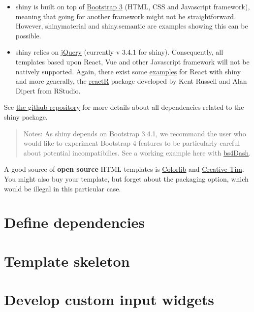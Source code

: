 \documentclass[]{book}
\providecommand{\tightlist}{%
  \setlength{\itemsep}{0pt}\setlength{\parskip}{0pt}}
\begin{document}
\begin{itemize}
\tightlist
\item
  shiny is built on top of \href{https://getbootstrap.com/docs/3.3/}{Bootstrap 3} (HTML, CSS and Javascript framework), meaning that going for another framework might
  not be straightforward. However, shinymaterial and shiny.semantic are examples showing
  this can be possible.
\item
  shiny relies on \href{https://jquery.com}{jQuery} (currently v 3.4.1 for shiny). Consequently, all templates based upon React, Vue and other Javascript framework will not be natively supported. Again, there exist some \href{https://github.com/alandipert/react-widget-demo/blob/master/app.R}{examples} for React with shiny and more generally,
  the \href{https://react-r.github.io/reactR/}{reactR} package developed by Kent Russell and Alan Dipert from RStudio.
\end{itemize}

See \href{https://github.com/rstudio/shiny/tree/master/inst/www/shared}{the github repository} for more details about all dependencies related to the shiny package.

\begin{quote}
Notes: As shiny depends on Bootstrap 3.4.1, we recommand the user who would like to
experiment Bootstrap 4 features to be particularly careful about potential incompatibilies. See a working example here with \href{https://github.com/RinteRface/bs4Dash}{bs4Dash}.
\end{quote}

A good source of \textbf{open source} HTML templates is \href{https://colorlib.com}{Colorlib} and \href{https://www.creative-tim.com/bootstrap-themes/free}{Creative Tim}. You might also buy your template, but forget about the packaging option, which would be illegal in this particular case.

\hypertarget{custom-templates-dependencies}{%
\chapter{Define dependencies}\label{custom-templates-dependencies}}

\hypertarget{custom-templates-skeleton}{%
\chapter{Template skeleton}\label{custom-templates-skeleton}}

\hypertarget{custom-templates-inputs}{%
\chapter{Develop custom input widgets}\label{custom-templates-inputs}}
\end{document}
